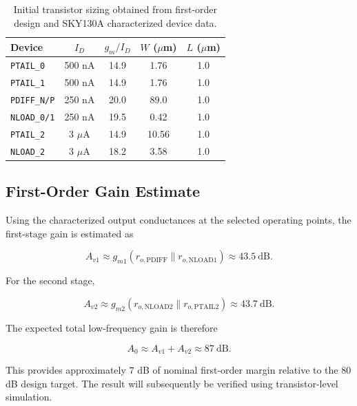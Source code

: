 \begin{table}[ht]
    \centering
    \caption{Initial transistor sizing obtained from first-order design and
    SKY130A characterized device data.}
    \label{tab:initial_sizing}
    \begin{tabular}{lcccc}
        \hline
        Device & $I_D$ & $g_m/I_D$ & $W$ ($\mu$m) & $L$ ($\mu$m) \\
        \hline
        \texttt{PTAIL\_0} & 500 nA & 14.9 & 1.76 & 1.0 \\
        \texttt{PTAIL\_1} & 500 nA & 14.9 & 1.76 & 1.0 \\
        \texttt{PDIFF\_N/P} & 250 nA & 20.0 & 89.0 & 1.0 \\
        \texttt{NLOAD\_0/1} & 250 nA & 19.5 & 0.42 & 1.0 \\
        \texttt{PTAIL\_2} & 3 $\mu$A & 14.9 & 10.56 & 1.0 \\
        \texttt{NLOAD\_2} & 3 $\mu$A & 18.2 & 3.58 & 1.0 \\
        \hline
    \end{tabular}
\end{table}


\subsection{First-Order Gain Estimate}

Using the characterized output conductances at the selected operating
points, the first-stage gain is estimated as

\[
A_{v1}
\approx
g_{m1}
\left(
r_{o,\mathrm{PDIFF}}
\parallel
r_{o,\mathrm{NLOAD1}}
\right)
\approx
43.5~\mathrm{dB}.
\]

For the second stage,

\[
A_{v2}
\approx
g_{m2}
\left(
r_{o,\mathrm{NLOAD2}}
\parallel
r_{o,\mathrm{PTAIL2}}
\right)
\approx
43.7~\mathrm{dB}.
\]

The expected total low-frequency gain is therefore

\[
\boxed{
A_0
\approx
A_{v1}+A_{v2}
\approx
87~\mathrm{dB}
}.
\]

This provides approximately $7$ dB of nominal first-order margin relative
to the $80$ dB design target. The result will subsequently be verified
using transistor-level simulation.
